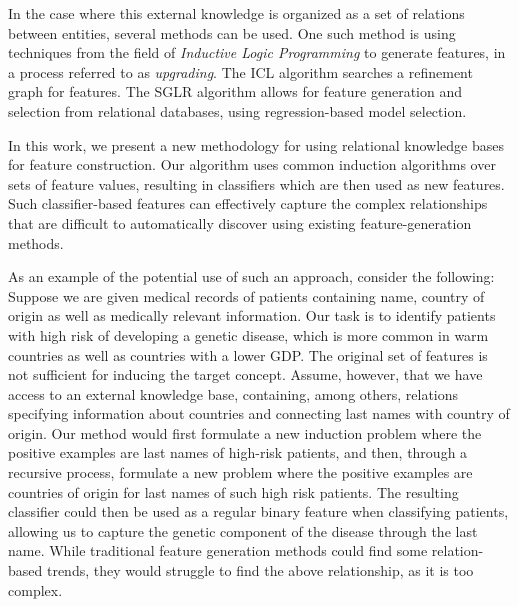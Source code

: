 \documentclass[12pt, a4paper]{article}
\theoremstyle{definition}
\begin{document}
In the case where this external knowledge is organized as a set of relations between entities, several methods can be used. One such method is using techniques from the field of \emph{Inductive Logic Programming} \citet{muggleton1991inductive} to generate features, in a process referred to as \emph{upgrading}. The ICL algorithm \citet{van2001upgrade} searches a refinement graph for features. The SGLR algorithm \citet{popescul200716} allows for feature generation and selection from relational databases, using regression-based model selection.

In this work, we present a new methodology for using relational knowledge bases for feature construction.  Our algorithm uses common induction algorithms over sets of feature values, resulting in classifiers which are then used as new features.
Such classifier-based features can effectively capture the complex relationships that are difficult to automatically discover using existing feature-generation methods.

As an example of the potential use of such an approach, consider the following:
Suppose we are given medical records of patients containing name, country of origin as well as medically relevant information.
Our task is to identify patients with high risk of developing a genetic disease, which is more common in warm countries as well as countries with a lower GDP.
The original set of features is not sufficient for inducing the target concept.  Assume, however, that we have access to an external knowledge base, containing, among others, relations specifying information about countries and connecting last names with country of origin.
Our method would first formulate a new induction problem where the positive examples are last names of high-risk patients, and then, through a recursive process, formulate a new problem where the positive examples are countries of origin for last names of such high risk patients. The resulting classifier could then be used as a regular binary feature when classifying patients, allowing us to capture the genetic component of the disease through the last name.
While traditional feature generation methods could find some relation-based trends, they would struggle to find the above relationship, as it is too complex.

\end{document}
